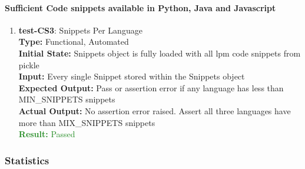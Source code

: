 \documentclass[12pt, titlepage]{article}
\begin{document}
\paragraph{Sufficient Code snippets available in Python, Java and Javascript}
\begin{enumerate}

\item{\textbf{test-CS3}: Snippets Per Language} \\
\textbf{Type:} Functional, Automated \\
\textbf{Initial State:} Snippets object is fully loaded with all lpm code snippets from pickle\\
\textbf{Input:} Every single Snippet stored within the Snippets object \\
\textbf{Expected Output:} Pass or assertion error if any language has less than MIN\_SNIPPETS snippets\\
\textbf{Actual Output:} No assertion error raised. Assert all three languages have more than MIX\_SNIPPETS snippets\\
\textcolor{ForestGreen}{\textbf{Result:} Passed}

\end{enumerate}

\subsubsection{Statistics}
\end{document}
